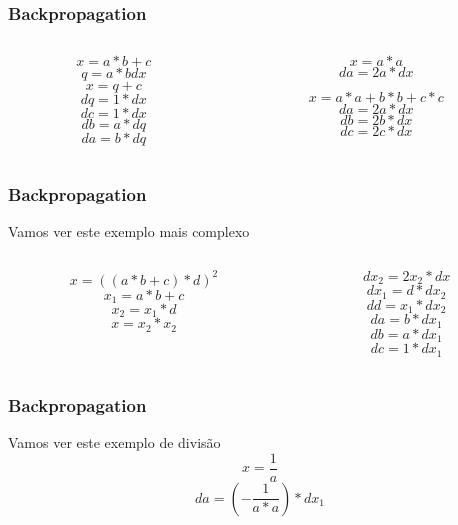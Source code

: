 \documentclass{beamer}
\begin{document}
\begin{frame}
	\frametitle{Backpropagation}

		\begin{columns}
			\begin{column}{0.35\textwidth}
				\begin{example}
					$$x = a * b + c$$
					$$q = a*b dx$$ 
					$$x = q+c$$ 
					$$dq = 1 * dx$$
					$$dc = 1 * dx$$
					$$db = a * dq$$
					$$da = b * dq$$
				\end{example}
			\end{column}
			\begin{column}{0.35\textwidth}
				\begin{example}
					$$x = a * a$$ 
					$$da = 2a * dx$$
				\end{example} 
				\begin{example}
				$$x = a * a + b * b + c * c$$ 
				$$da = 2a * dx$$
				$$db = 2b * dx$$
				$$dc = 2c * dx$$
			\end{example} 
			\end{column}
		\end{columns}

\end{frame}
\begin{frame}
	\frametitle{Backpropagation}
	\begin{example}
		Vamos ver este exemplo mais complexo
		\begin{columns}
			\begin{column}{0.35\textwidth}
				$$x = ((a * b + c) * d)^2$$
				$$x_1 = a*b+c$$ 
				$$x_2 = x_1*d$$ 
				$$x = x_2 * x_2 $$
			\end{column}
			\begin{column}{0.35\textwidth}
				$$dx_2 = 2x_2 * dx$$ 
				$$dx_1 = d * dx_2$$ 
				$$dd = x_1*dx_2$$
				$$da = b*dx_1$$
				$$db = a*dx_1$$
				$$dc = 1*dx_1$$
			\end{column}
		\end{columns}
	\end{example}
\end{frame}
\begin{frame}
	\frametitle{Backpropagation}
		\begin{example}
			Vamos ver este exemplo de divisão
			$$x = \frac{1}{a}$$
			$$da = (-\frac{1}{a*a})*dx_1$$
		\end{example}
\end{frame}
\end{document}
